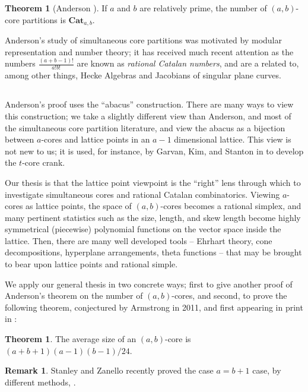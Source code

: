 \documentclass{amsart}[12pt]
\theoremstyle{definition}
\newtheorem{theorem}[dummy]{Theorem}
\newtheorem{remark}[dummy]{Remark}
\newcommand{\Cat}{\mathbf{Cat}}
\begin{document}
\begin{theorem}[Anderson \cite{anderson}]
If $a$ and $b$ are relatively prime, the number of
$(a,b)$-core partitions is $\Cat_{a,b}$.
\end{theorem}

Anderson's study of simultaneous core partitions was motivated by
modular representation and number theory; it has received much recent
attention as the numbers $\frac{(a+b-1)!}{a!b!}$ are known as
\emph{rational Catalan numbers}, and are a related to, among other things,
Hecke Algebras and Jacobians of singular plane curves.

\subsection{}

Anderson's proof uses the ``abacus'' construction.  There are many ways to view this construction; we take a slightly different view than Anderson, and most of the simultaneous core partition literature, and view the abacus as a bijection between $a$-cores and lattice points in an $a-1$ dimensional lattice.  This view is not new to us; it is used, for instance, by Garvan, Kim, and Stanton in \cite{GKS} to develop the $t$-core crank.

Our thesis is that the lattice point viewpoint is the ``right'' lens through which to investigate simultaneous cores and rational Catalan combinatorics.  Viewing $a$-cores as lattice points, the space of $(a,b)$-cores becomes a rational simplex, and many pertinent statistics such as the size, length, and skew length become highly symmetrical (piecewise) polynomial functions on the vector space inside the lattice.
Then, there are many well developed tools -- Ehrhart theory, cone decompositions, hyperplane arrangements, theta functions -- that may be brought to bear upon lattice points and rational simple.

We apply our general thesis in two concrete ways; first to give another proof of Anderson's theorem on the number of $(a,b)$-cores, and second, to prove the following theorem, conjectured by Armstrong in 2011, and first appearing in print in \cite{AHJ}:

\begin{theorem}
The average size of an $(a,b)$-core is $(a+b+1)(a-1)(b-1)/24$.
\end{theorem}

\begin{remark} Stanley and Zanello recently proved the case $a=b+1$ case, by different methods, \cite{SZ}.
\end{remark}
\end{document}
